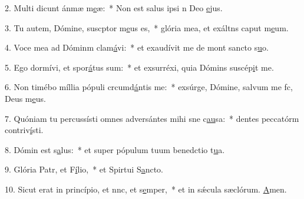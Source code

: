 2. Multi dicunt ánmæ m\uline{e}æ:~* Non est salus ipsi n Deo \uline{e}jus.\par 
3. Tu autem, Dómine, suscptor m\uline{e}us es,~* glória mea, et exáltns caput m\uline{e}um.\par 
4. Voce mea ad Dóminm clam\uline{á}vi:~* et exaudívit me de mont sancto s\uline{u}o.\par 
5. Ego dormívi, et spor\uline{á}tus sum:~* et exsurréxi, quia Dómins suscép\uline{i}t me.\par 
6. Non timébo míllia pópuli crcumd\uline{á}ntis me:~* exsúrge, Dómine, salvum me fc, Deus m\uline{e}us.\par 
7. Quóniam tu percussísti omnes adversántes mihi sne c\uline{au}sa:~* dentes peccatórm contriv\uline{í}sti.\par 
8. Dómin est s\uline{a}lus:~* et super pópulum tuum benedctio t\uline{u}a.\par 
9. Glória Patr, et F\uline{í}lio,~* et Spirtui S\uline{a}ncto.\par 
10. Sicut erat in princípio, et nnc, et s\uline{e}mper,~* et in sǽcula sæclórum. \uline{A}men.\par 
